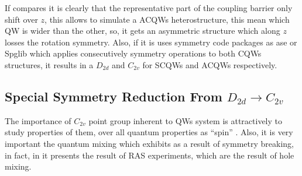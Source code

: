 If compares  it is clearly that the representative part of the coupling barrier only shift over $z$, this allows to simulate a \gls{ACQWs} heterostructure, this mean which \gls{QW} is wider than the other, so, it gets an asymmetric structure which along $z$ losses the rotation symmetry. Also, if it is uses symmetry code packages as \gls{ase} or \gls{Spglib} which applies consecutively symmetry operations to both \gls{CQWs} structures, it results in a $D_{2d}$ and $C_{2v}$ for \gls{SCQWs} and \gls{ACQWs} respectively.  
 
\subsection{Special Symmetry Reduction From $D_{2d}\to C_{2v}$}
\label{subsubsec:chapter-2-special-symmetry}
\vspace{-10mm} 
The importance of $C_{2v}$ point group inherent to QWs system is attractively to study properties of them, over all quantum properties as ``spin'' \cite{andrada1997spin,luo2015supercoupling,ivchenko2008spinphoto,glazov2018electron,winkler2003spin,ohrmann2004anomalousspin}. Also, it is very important the quantum mixing which exhibits as a result of symmetry breaking, in fact, in  it presents the result of RAS experiments,  which are the result of hole mixing. 


